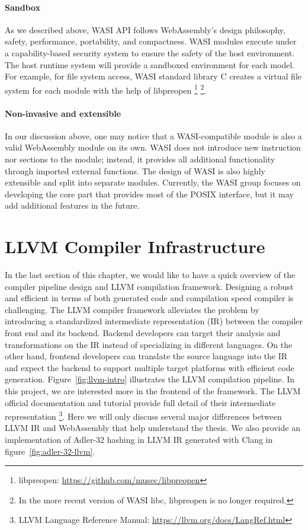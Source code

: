 \paragraph{Sandbox}
As we described above, WASI API follows WebAssembly's design philosophy, safety,
performance, portability, and compactness. WASI modules execute under a
capability-based security system to ensure the safety of the host environment.
The host runtime system will provide a sandboxed environment for each model. For
example, for file system access, WASI standard library C creates a virtual file
system for each module with the help of libpreopen \footnote{libpreopen:
  \url{https://github.com/musec/libpreopen}} \footnote{In the more recent
  version of WASI libc, libpreopen is no longer required.}.

\paragraph{Non-invasive and extensible}
In our discussion above, one may notice that a WASI-compatible module is also a
valid WebAssembly module on its own. WASI does not introduce new instruction nor
sections to the module; instead, it provides all additional functionality
through imported external functions. The design of WASI is also highly
extensible and split into separate modules. Currently, the WASI group focuses
on developing the core part that provides most of the POSIX interface, but it
may add additional features in the future.

\section{LLVM Compiler Infrastructure}

In the last section of this chapter, we would like to have a quick overview of
the compiler pipeline design and LLVM compilation framework. Designing a robust
and efficient in terms of both generated code and compilation speed compiler is
challenging. The LLVM compiler framework \cite{llvm-thesis} alleviates the
problem by introducing a standardized intermediate representation (IR) between
the compiler front end and its backend. Backend developers can target their
analysis and transformations on the IR instead of specializing in different
languages. On the other hand, frontend developers can translate the source
language into the IR and expect the backend to support multiple target platforms
with efficient code generation. Figure~\ref{fig:llvm-intro} illustrates the LLVM
compilation pipeline. In this project, we are interested more in the frontend of
the framework. The LLVM official documentation and tutorial provide full detail
of their intermediate representation \footnote{LLVM Language Reference Manual:
  \url{https://llvm.org/docs/LangRef.html}}. Here we will only discuss several
major differences between LLVM IR and WebAssembly that help understand the
thesis. We also provide an implementation of Adler-32 hashing in LLVM IR
generated with Clang in figure~\ref{fig:adler-32-llvm}.

